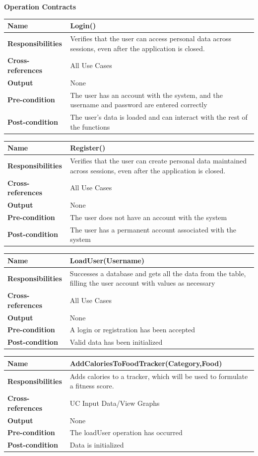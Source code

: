 \documentclass[10pt]{article}
\begin{document}
\textbf{Operation Contracts}
\begin{longtable}[]{@{}ll@{}}
\toprule
\textbf{Name} & \textbf{Login()}\tabularnewline
\midrule
\endhead
\textbf{Responsibilities} & Verifies that the user can access personal data across sessions, even after the application is closed.\tabularnewline
\textbf{Cross-references} & All Use Cases\tabularnewline
\textbf{Output} & None\tabularnewline
\textbf{Pre-condition} & The user has an account with the system, and the username and password are entered correctly\tabularnewline
\textbf{Post-condition} & The user’s data is loaded and can interact with the rest of the functions\tabularnewline
\bottomrule
\end{longtable}
\begin{longtable}[]{@{}ll@{}}
\toprule
\textbf{Name} & \textbf{Register()}\tabularnewline
\midrule
\endhead
\textbf{Responsibilities} & Verifies that the user can create personal data maintained across sessions, even after the application is closed.\tabularnewline
\textbf{Cross-references} & All Use Cases\tabularnewline
\textbf{Output} & None\tabularnewline
\textbf{Pre-condition} & The user does not have an account with the system\tabularnewline
\textbf{Post-condition} & The user has a permanent account associated with the system\tabularnewline
\bottomrule
\end{longtable}
\begin{longtable}[]{@{}ll@{}}
\toprule
\textbf{Name} & \textbf{LoadUser(Username)}\tabularnewline
\midrule
\endhead
\textbf{Responsibilities} & Successes a database and gets all the data from the table, filling the user account with values as necessary\tabularnewline
\textbf{Cross-references} & All Use Cases\tabularnewline
\textbf{Output} & None\tabularnewline
\textbf{Pre-condition} & A login or registration has been accepted\tabularnewline
\textbf{Post-condition} & Valid data has been initialized\tabularnewline
\bottomrule
\end{longtable}
\begin{longtable}[]{@{}ll@{}}
\toprule
\textbf{Name} & \textbf{AddCaloriesToFoodTracker(Category,Food)}\tabularnewline
\midrule
\endhead
\textbf{Responsibilities} & Adds calories to a tracker, which will be used to formulate a fitness score.\tabularnewline
\textbf{Cross-references} & UC Input Data/View Graphs\tabularnewline
\textbf{Output} & None\tabularnewline
\textbf{Pre-condition} & The loadUser operation has occurred\tabularnewline
\textbf{Post-condition} & Data is initialized\tabularnewline
\bottomrule
\end{longtable}
\end{document}
